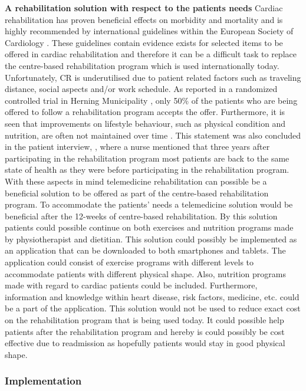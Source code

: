 \textbf{A rehabilitation solution with respect to the patients needs} \newline
Cardiac rehabilitation has proven beneficial effects on morbidity and mortality and is highly recommended by international guidelines within the European Society of Cardiology \cite{ESC}. These guidelines contain evidence exists for selected items to be offered in cardiac rehabilitation and therefore it can be a difficult task to replace the centre-based rehabilitation program which is used internationally today. Unfortunately, CR is underutilised due to patient related factors such as traveling distance, social aspects and/or work schedule. As reported in a randomized controlled trial in Herning Municipality \cite{rehab}, only 50\% of the patients who are being offered to follow a rehabilitation program accepts the offer. Furthermore, it is seen that improvements on lifestyle behaviour, such as physical condition and nutrition, are often not maintained over time \cite{CAD}. This statement was also concluded in the patient interview, , where a nurse mentioned that three years after participating in the rehabilitation program most patients are back to the same state of health as they were before participating in the rehabilitation program. With these aspects in mind telemedicine rehabilitation can possible be a beneficial solution to be offered as part of the centre-based rehabilitation program. To accommodate the patients’ needs a telemedicine solution would be beneficial after the 12-weeks of centre-based rehabilitation. By this solution patients could possible continue on both exercises and nutrition programs made by physiotherapist and dietitian. This solution could possibly be implemented as an application that can be downloaded to both smartphones and tablets. The application could consist of exercise programs with different levels to accommodate patients with different physical shape. Also, nutrition programs made with regard to cardiac patients could be included. Furthermore, information and knowledge within heart disease, risk factors, medicine, etc. could be a part of the application. This solution would not be used to reduce exact cost on the rehabilitation program that is being used today. It could possible help patients after the rehabilitation program and hereby is could possibly be cost effective due to readmission as hopefully patients would stay in good physical shape. 


\subsubsection{Implementation}

